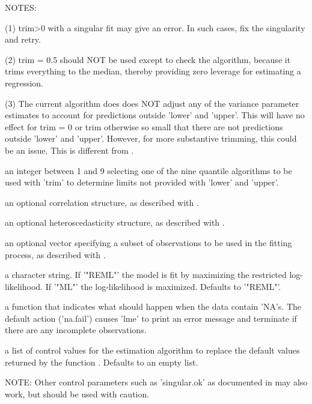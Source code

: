 \documentclass{article}
\begin{document}
\begin{Arguments}
\begin{ldescription}
NOTES:

(1) trim>0 with a singular fit may give an error.  In such cases,
fix the singularity and retry.

(2) trim = 0.5 should NOT be used except to check the algorithm,
because it trims everything to the median, thereby providing zero
leverage for estimating a regression.

(3) The current algorithm does does NOT adjust any of the variance
parameter estimates to account for predictions outside 'lower' and
'upper'.  This will have no effect for trim = 0 or trim otherwise so
small that there are not predictions outside 'lower' and 'upper'.
However, for more substantive trimming, this could be an issue.
This is different from . 

\item[\code{quantileType}] an integer between 1 and 9 selecting one of the nine quantile
algorithms to be used with 'trim' to determine limits not provided
with 'lower' and 'upper'.  

\item[\code{correlation}] an optional correlation structure, as described with
. 

\item[\code{weights}] an optional heteroscedasticity structure, as described with
. 

\item[\code{ subset }] an optional vector specifying a subset of observations to be used in
the fitting process, as described with .  

\item[\code{method}] a character string.  If '"REML"' the model is fit by maximizing the
restricted log-likelihood.  If '"ML"' the log-likelihood is
maximized.  Defaults to '"REML"'. 

\item[\code{ na.action }] a function that indicates what should happen when the data contain
'NA's.  The default action ('na.fail') causes 'lme' to print an
error message and terminate if there are any incomplete
observations. 

\item[\code{control}] a list of control values for the estimation algorithm to replace the
default values returned by the function
. Defaults to an empty list.

NOTE:  Other control parameters such as 'singular.ok' as documented
in  may also work, but should be used with
caution.  


\end{ldescription}
\end{Arguments}
\end{document}
